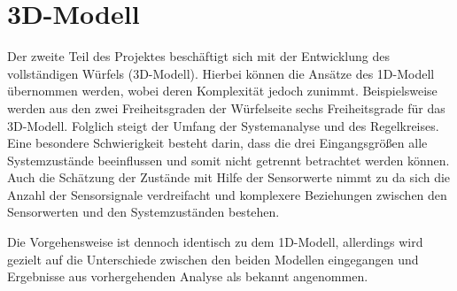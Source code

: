 \section{3D-Modell}
Der zweite Teil des Projektes beschäftigt sich mit der Entwicklung des vollständigen Würfels (3D-Modell). Hierbei können die Ansätze des 1D-Modell übernommen werden, wobei deren Komplexität jedoch zunimmt. Beispielsweise werden aus den zwei Freiheitsgraden der Würfelseite sechs Freiheitsgrade für das 3D-Modell. Folglich steigt der Umfang der Systemanalyse und des Regelkreises. Eine besondere Schwierigkeit besteht darin, dass die drei Eingangsgrößen alle Systemzustände beeinflussen und somit nicht getrennt betrachtet werden können. Auch die Schätzung der Zustände mit Hilfe der Sensorwerte nimmt zu da sich die Anzahl der Sensorsignale verdreifacht und komplexere Beziehungen zwischen den Sensorwerten und den Systemzuständen bestehen.

Die Vorgehensweise ist dennoch identisch zu dem 1D-Modell, allerdings wird gezielt auf die Unterschiede zwischen den beiden Modellen eingegangen und Ergebnisse aus vorhergehenden Analyse als bekannt angenommen.


